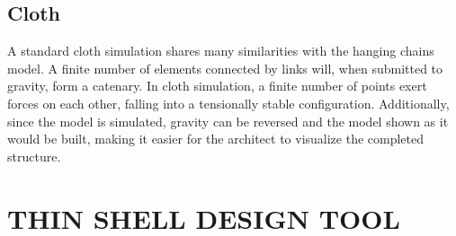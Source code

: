 \documentclass{thesis}
\begin{document}
\section{Cloth}
A standard cloth simulation shares many similarities with the hanging chains model.  A finite number of elements connected by links will, when
submitted to gravity, form a catenary.  In cloth simulation, a finite number of points exert forces on each other, falling into a tensionally stable
configuration.  Additionally, since the model is simulated, gravity can be reversed and the model shown as it would be built, making it easier for
the architect to visualize the completed structure.

\chapter{THIN SHELL DESIGN TOOL}
\end{document}
